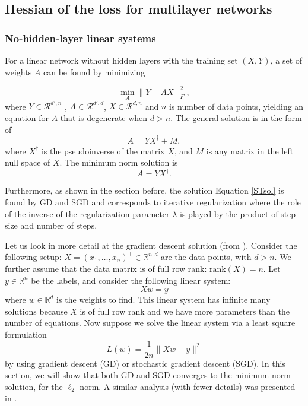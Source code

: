 \documentclass[10pt]{article}
\begin{document}
\subsection{Hessian of  the  loss for multilayer networks}
\label{MultiNets}

\subsubsection{No-hidden-layer linear systems}
\label{MinNorm}


For a linear network without hidden layers with the
training set $(X,Y)$, a
set of weights $A$ can be
found by minimizing

\begin{equation}
\min_A \|Y-AX\|^2_F,
\end{equation}
where  $Y\in \mathcal{R}^{d',n}$ , $A \in \mathcal{R}^{d',d}$,
$X\in \mathcal{R}^{d,n}$ and $n$ is number of data points, 
\noindent yielding an equation for $A$ that is degenerate when $d >
n$. The general solution is
in the form of
\begin{equation*}
A=YX^{\dagger} + M,
\end{equation*}
\noindent where  $X^{\dagger}$ is the pseudoinverse of the matrix $X$, and $M$ is any matrix in the left null space of $X$. The minimum norm solution is
\begin{equation}
A=YX^{\dagger}. 
\label{STsol}
\end{equation}

Furthermore, as shown in the section before, the solution
Equation \ref{STsol} is found by GD and SGD and corresponds to
iterative regularization where the role of the inverse of the regularization
parameter $\lambda$ is played by the product of step size and number
of steps\cite{rosasco2015learning}.



Let us look in more detail at the gradient descent solution (from
\cite{Musings2017}). Consider the following setup:
$X=(x_1,\ldots,x_n)^\top \in\mathbb{R}^{n, d}$ are the data points,
with $d>n$. We further assume that the data matrix is of full row
rank: $\text{rank}(X)=n$.  Let $y\in\mathbb{R}^n$ be the labels, and
consider the following linear system:
\begin{equation}
  Xw=y\label{eq:min-norm-ls}
\end{equation}
where $w\in\mathbb{R}^d$ is the weights to find. This linear system
has infinite many solutions because $X$ is of full row rank and we
have more parameters than the number of equations. Now suppose we
solve the linear system via a least square formulation
\begin{equation}
  L(w) = \frac{1}{2n}\|Xw-y\|^2\label{eq:min-norm-ls-objv}
\end{equation}
by using gradient descent (GD) or stochastic gradient descent
(SGD). In this section, we will show that both GD and SGD converges to
the minimum norm solution, for the $\ell_2$ norm. A similar analysis
(with fewer details) was presented in \cite{zhang2016}.
\end{document}
